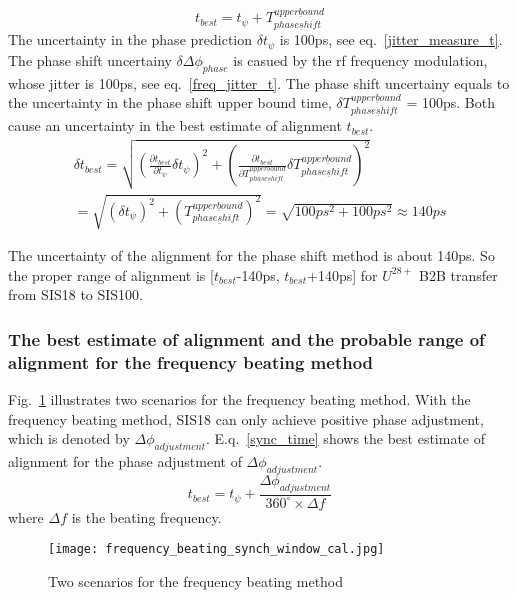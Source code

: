 \begin{equation}
t_{best} = t_{\psi} + T_{phase\underline shift}^{upper\underline bound} \label{Phase_win}
\end{equation}
The uncertainty in the phase prediction $\delta t_{\psi}$ is 100ps, see eq.~\ref{jitter_measure_t}. The phase shift uncertainy $\delta \Delta \phi_{phase}$ is casued by the rf frequency modulation, whose jitter is 100ps, see eq.~\ref{freq_jitter_t}. The phase shift uncertainy equals to the uncertainty in the phase shift upper bound time, $\delta T_{phase\underline shift}^{upper\underline bound}$ = 100ps. Both cause an uncertainty in the best estimate of alignment $t_{best}$.
\begin{equation}
\begin{aligned}
\delta t_{best} =\sqrt {(\frac {\partial t_{best}}{\partial t_{\psi}}\delta t_{\psi})^2 + (\frac {\partial t_{best}}{\partial T_{phase\underline shift}^{upper\underline bound}}\delta T_{phase\underline shift}^{upper\underline bound})^2} \\
 =\sqrt {(\delta t_{\psi})^2+(T_{phase\underline shift}^{upper\underline bound})^2} =\sqrt { 100ps^2+100ps^2}\approx 140ps \label{Phase_uncertainty}
\end{aligned}
\end{equation}

The uncertainty of the alignment for the phase shift method is about 140ps. So the proper range of alignment is [$t_{best}$-140ps, $t_{best}$+140ps] for $U^{28+}$ B2B transfer from SIS18 to SIS100.
\subsubsection{The best estimate of alignment and the probable range of alignment for the frequency beating method}
Fig.~\ref{frequency_beating} illustrates two scenarios for the frequency beating method. With the frequency beating method, SIS18 can only achieve positive phase adjustment, which is denoted by $\Delta \phi_{adjustment}$. E.q.~\ref{sync_time} shows the best estimate of alignment for the phase adjustment of $\Delta \phi_{adjustment}$.
\begin{equation}
	 t_{best} = t_{\psi}+\frac {\Delta \phi_{adjustment}}{{360^\circ} \times {\Delta f}} \label {sync_time}
   \end{equation}
where $\Delta f$ is the beating frequency.
\begin{figure}[!htb]
   \centering   
   \texttt{[image: frequency\_beating\_synch\_window\_cal.jpg]}
   \caption{Two scenarios for the frequency beating method}
   \label{frequency_beating}
\end{figure}

